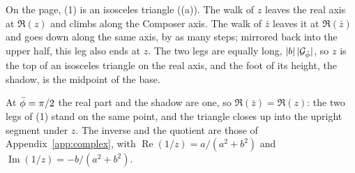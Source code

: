 On the page, (1) is an isosceles triangle ((a)). The walk of $z$ leaves the real axis at $\Re(z)$ and climbs along the Composer axis. The walk of $\bar{z}$ leaves it at $\Re(\bar{z})$ and goes down along the same axis, by as many steps; mirrored back into the upper half, this leg also ends at $z$. The two legs are equally long, $|b|\,|\mathcal{G}_{\bar{\phi}}|$, so $z$ is the top of an isosceles triangle on the real axis, and the foot of its height, the shadow, is the midpoint of the base.

\incomplex At $\bar{\phi} = \pi/2$ the real part and the shadow are one, so $\Re(\bar{z}) = \Re(z)$: the two legs of (1) stand on the same point, and the triangle closes up into the upright segment under $z$. The inverse and the quotient are those of Appendix~\ref{app:complex}, with $\operatorname{Re}(1/z) = a/(a^2 + b^2)$ and $\operatorname{Im}(1/z) = -b/(a^2 + b^2)$.

